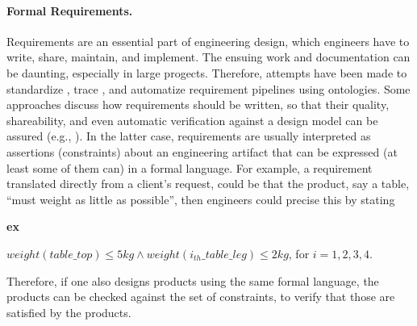 \documentclass[sw]{iosart2x}
\newcommand{\bflist}{\begin{list}{}{\setlength{\topsep}{2mm}\setlength{\partopsep}{0mm}\setlength{\parsep}{0mm}\setlength{\leftmargin}{9mm}\setlength{\labelwidth}{8mm}}}
\newcommand{\eflist}{\end{list}}
\newcommand{\ExLabel}{\textrm{ex}}
\newcommand{\myex}[1]{\refstepcounter{cntex}\begin{small}{\bf \ExLabel\thecntex\label{ex:#1}}\end{small}}
\newcounter{cntex}
\newcommand{\qquotes}[1]{``#1''}
\newcommand{\TODO}[1]{{\color{red} #1
}}
\begin{document}
{\paragraph{Formal Requirements.}
Requirements are an essential part of engineering design, which engineers have to write, share, maintain, and implement. 
The ensuing work and documentation can be daunting, especially in large progects. Therefore, attempts have been made to standardize \cite{alrumaihDomainOntologyRequirements2020}, trace \cite{murtazinaOntologybasedApproachSupport2019}, and automatize \cite{holterScopeDetectionTextual2021} requirement pipelines using ontologies. 
Some approaches discuss how requirements should be written, so that their quality, shareability, and even automatic verification against a design model can be assured (e.g., \cite{jinxinlinRequirementOntologyEngineering1996, chenOntologybasedRequirementVerification2020}).
In the latter case, requirements are usually interpreted as assertions (constraints) about an engineering artifact that can be expressed (at least some of them can) in a formal language. 
For example, a requirement translated directly from a client's request, could be that the product, say a table, \qquotes{must weight as little as possible}, then engineers could precise this by stating 
\bflist
  \item[\myex{req1}] $ weight(table\_top) \leq 5kg \land weight(i_{th}\_table\_leg) \leq 2kg$, for $i = 1,2,3,4$. 
\eflist
Therefore, if one also designs products using the same formal language, the products can be checked against the set of constraints, to verify that those are satisfied by the products.

}
\end{document}
